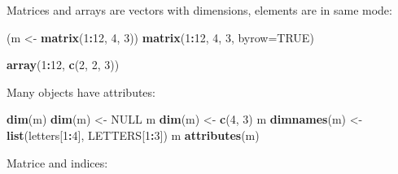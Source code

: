 \documentclass[12pt,]{book}
\newenvironment{Shaded}{\begin{snugshade}}{\end{snugshade}}
\newcommand{\DataTypeTok}[1]{\textcolor[rgb]{0.13,0.29,0.53}{#1}}
\newcommand{\DecValTok}[1]{\textcolor[rgb]{0.00,0.00,0.81}{#1}}
\newcommand{\KeywordTok}[1]{\textcolor[rgb]{0.13,0.29,0.53}{\textbf{#1}}}
\newcommand{\NormalTok}[1]{#1}
\newcommand{\OperatorTok}[1]{\textcolor[rgb]{0.81,0.36,0.00}{\textbf{#1}}}
\newcommand{\OtherTok}[1]{\textcolor[rgb]{0.56,0.35,0.01}{#1}}
\newcommand{\StringTok}[1]{\textcolor[rgb]{0.31,0.60,0.02}{#1}}
\begin{document}
Matrices and arrays are vectors with dimensions, elements are in same mode:

\begin{Shaded}
\begin{Highlighting}[]
\NormalTok{(m <-}\StringTok{ }\KeywordTok{matrix}\NormalTok{(}\DecValTok{1}\OperatorTok{:}\DecValTok{12}\NormalTok{, }\DecValTok{4}\NormalTok{, }\DecValTok{3}\NormalTok{))}
\KeywordTok{matrix}\NormalTok{(}\DecValTok{1}\OperatorTok{:}\DecValTok{12}\NormalTok{, }\DecValTok{4}\NormalTok{, }\DecValTok{3}\NormalTok{, }\DataTypeTok{byrow=}\OtherTok{TRUE}\NormalTok{)}

\KeywordTok{array}\NormalTok{(}\DecValTok{1}\OperatorTok{:}\DecValTok{12}\NormalTok{, }\KeywordTok{c}\NormalTok{(}\DecValTok{2}\NormalTok{, }\DecValTok{2}\NormalTok{, }\DecValTok{3}\NormalTok{))}
\end{Highlighting}
\end{Shaded}

Many objects have attributes:

\begin{Shaded}
\begin{Highlighting}[]
\KeywordTok{dim}\NormalTok{(m)}
\KeywordTok{dim}\NormalTok{(m) <-}\StringTok{ }\OtherTok{NULL}
\NormalTok{m}
\KeywordTok{dim}\NormalTok{(m) <-}\StringTok{ }\KeywordTok{c}\NormalTok{(}\DecValTok{4}\NormalTok{, }\DecValTok{3}\NormalTok{)}
\NormalTok{m}
\KeywordTok{dimnames}\NormalTok{(m) <-}\StringTok{ }\KeywordTok{list}\NormalTok{(letters[}\DecValTok{1}\OperatorTok{:}\DecValTok{4}\NormalTok{], LETTERS[}\DecValTok{1}\OperatorTok{:}\DecValTok{3}\NormalTok{])}
\NormalTok{m}
\KeywordTok{attributes}\NormalTok{(m)}
\end{Highlighting}
\end{Shaded}

Matrice and indices:

\begin{Shaded}
\end{Shaded}
\end{document}
